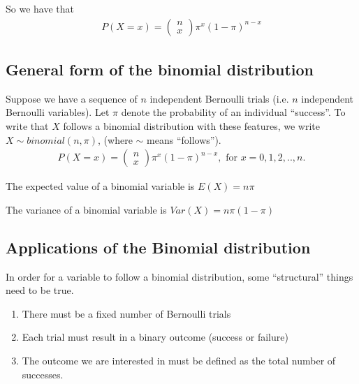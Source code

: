 \documentclass[letterpaper,10pt,english]{jupyterBook}
\begin{document}
\sphinxAtStartPar
So we have that
\begin{equation*}
\begin{split}
P(X=x) = \begin{pmatrix}n \\ x \end{pmatrix} \pi^{x} (1-\pi)^{n-x}
\end{split}
\end{equation*}

\subsection{General form of the binomial distribution}
\label{\detokenize{02.c. Probability.Discrete:general-form-of-the-binomial-distribution}}
\sphinxAtStartPar
Suppose we have a sequence of \(n\) independent Bernoulli trials (i.e. \(n\) independent Bernoulli variables). Let \(\pi\) denote the probability of an individual “success”.  To write that \(X\) follows a binomial distribution with these features, we write \(X\sim binomial(n,\pi)\), (where \(\sim\) means “follows”).
\begin{equation*}
\begin{split}
P(X=x) = \begin{pmatrix}n \\ x \end{pmatrix} \pi^{x} (1-\pi)^{n-x}, \mbox{ for } x=0,1,2,..,n.
\end{split}
\end{equation*}
\sphinxAtStartPar
{}

\sphinxAtStartPar
The expected value of a binomial variable is \(E(X) = n\pi\)

\sphinxAtStartPar
The variance of a binomial variable is \(Var(X) = n\pi (1-\pi)\)


\subsection{Applications of the Binomial distribution}
\label{\detokenize{02.c. Probability.Discrete:applications-of-the-binomial-distribution}}
\sphinxAtStartPar
{}

\sphinxAtStartPar
In order for a variable to follow a binomial distribution, some “structural” things need to be true.
\begin{enumerate}
%
\item {} 
\sphinxAtStartPar
There must be a fixed number of Bernoulli trials

\item {} 
\sphinxAtStartPar
Each trial must result in a binary outcome (success or failure)

\item {} 
\sphinxAtStartPar
The outcome we are interested in must be defined as the total number of successes.

\end{enumerate}
\end{document}
